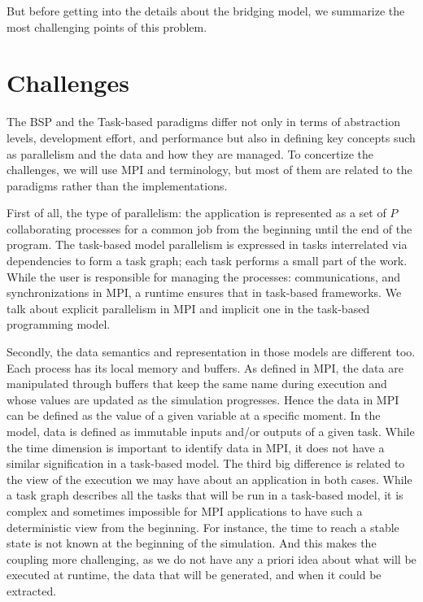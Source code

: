 But before getting into the details about the bridging model, we summarize the most challenging points of this problem.

\section{Challenges}\label{sec:challanges}

The BSP and the Task-based paradigms differ not only in terms of abstraction levels, development effort, and performance but also in defining key concepts such as parallelism and the data and how they are managed. To concertize the challenges, we will use MPI and \dask terminology, but most of them are related to the paradigms rather than the implementations. 

First of all, the type of parallelism: the application is represented as a set of $P$ collaborating processes for a common job from the beginning until the end of the program. 
The task-based model parallelism is expressed in tasks interrelated via dependencies to form a task graph; each task performs a small part of the work. While the user is responsible for managing the processes: communications, and synchronizations in MPI, a runtime ensures that in task-based frameworks. 
We talk about explicit parallelism in MPI and implicit one in the task-based programming model. 

Secondly, the data semantics and representation in those models are different too. Each process has its local memory and buffers. As defined in MPI, the data are manipulated through buffers that keep the same name during execution and whose values are updated as the simulation progresses. Hence the data in MPI can be defined as the value of a given variable at a specific moment.
In the \dask model, data is defined as immutable inputs and/or outputs of a given task. While the time dimension is important to identify data in MPI, it does not have a similar signification in a task-based model. 
The third big difference is related to the view of the execution we may have about an application in both cases. While a task graph describes all the tasks that will be run in a task-based model, it is complex and sometimes impossible for MPI applications to have such a deterministic view from the beginning. For instance, the time to reach a stable state is not known at the beginning of the simulation. And this makes the coupling more challenging, as we do not have any a priori idea about what will be executed at runtime, the data that will be generated, and when it could be extracted.

